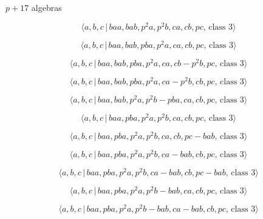 \documentclass[10pt]{article}
\begin{document}
$p+17$ algebras

\begin{equation}
\langle a,b,c\,|\,baa,bab,p^2a,p^2b,ca,cb,pc,\,\text{class }3\rangle 
\tag{7.2612}
\end{equation}

\begin{equation}
\langle a,b,c\,|\,baa,bab,pba,p^2a,ca,cb,pc,\,\text{class }3\rangle 
\tag{7.2613}
\end{equation}

\begin{equation}
\langle a,b,c\,|\,baa,bab,pba,p^2a,ca,cb-p^2b,pc,\,\text{class }3\rangle 
\tag{7.2614}
\end{equation}

\begin{equation}
\langle a,b,c\,|\,baa,bab,pba,p^2a,ca-p^2b,cb,pc,\,\text{class }3\rangle 
\tag{7.2615}
\end{equation}

\begin{equation}
\langle a,b,c\,|\,baa,bab,p^2a,p^2b-pba,ca,cb,pc,\,\text{class }3\rangle 
\tag{7.2616}
\end{equation}

\begin{equation}
\langle a,b,c\,|\,baa,pba,p^2a,p^2b,ca,cb,pc,\,\text{class }3\rangle 
\tag{7.2617}
\end{equation}

\begin{equation}
\langle a,b,c\,|\,baa,pba,p^2a,p^2b,ca,cb,pc-bab,\,\text{class }3\rangle 
\tag{7.2618}
\end{equation}

\begin{equation}
\langle a,b,c\,|\,baa,pba,p^2a,p^2b,ca-bab,cb,pc,\,\text{class }3\rangle 
\tag{7.2619}
\end{equation}

\begin{equation}
\langle a,b,c\,|\,baa,pba,p^2a,p^2b,ca-bab,cb,pc-bab,\,\text{class }3\rangle
\tag{7.2620}
\end{equation}

\begin{equation}
\langle a,b,c\,|\,baa,pba,p^2a,p^2b-bab,ca,cb,pc,\,\text{class }3\rangle 
\tag{7.2621}
\end{equation}

\begin{equation}
\langle a,b,c\,|\,baa,pba,p^2a,p^2b-bab,ca-bab,cb,pc,\,\text{class }3\rangle
\tag{7.2622}
\end{equation}
\end{document}
